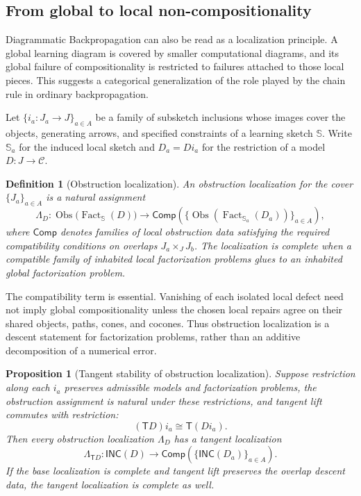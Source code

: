 \documentclass{article}
\newtheorem{definition}{Definition}
\newtheorem{proposition}{Proposition}
\newcommand{\C}{\mathcal{C}}
\newcommand{\T}{\mathsf{T}}
\newcommand{\INC}{\mathsf{INC}}
\newcommand{\Fact}{\operatorname{Fact}}
\newcommand{\Obs}{\operatorname{Obs}}
\begin{document}
\subsection{From global to local non-compositionality}

Diagrammatic Backpropagation can also be read as a localization principle.  A
global learning diagram is covered by smaller computational diagrams, and its
global failure of compositionality is restricted to failures attached to those
local pieces.  This suggests a categorical generalization of the role played
by the chain rule in ordinary backpropagation.

Let \(\{i_a:J_a\to J\}_{a\in A}\) be a family of subsketch inclusions whose
images cover the objects, generating arrows, and specified constraints of a
learning sketch \(\mathbb S\).  Write \(\mathbb S_a\) for the induced local
sketch and \(D_a=D i_a\) for the restriction of a model \(D:J\to\C\).

\begin{definition}[Obstruction localization]
An obstruction localization for the cover \(\{J_a\}_{a\in A}\) is a natural
assignment
\[
\Lambda_D:
\Obs\big(\Fact_{\mathbb S}(D)\big)
\longrightarrow
\mathsf{Comp}\!\left(
  \{\Obs(\Fact_{\mathbb S_a}(D_a))\}_{a\in A}
\right),
\]
where \(\mathsf{Comp}\) denotes families of local obstruction data satisfying
the required compatibility conditions on overlaps \(J_a\times_JJ_b\).  The
localization is \emph{complete} when a compatible family of inhabited local
factorization problems glues to an inhabited global factorization problem.
\end{definition}

The compatibility term is essential.  Vanishing of each isolated local defect
need not imply global compositionality unless the chosen local repairs agree on
their shared objects, paths, cones, and cocones.  Thus obstruction localization
is a descent statement for factorization problems, rather than an additive
decomposition of a numerical error.

\begin{proposition}[Tangent stability of obstruction localization]
Suppose restriction along each \(i_a\) preserves admissible models and
factorization problems, the obstruction assignment is natural under these
restrictions, and tangent lift commutes with restriction:
\[
(\T D)i_a\cong\T(Di_a).
\]
Then every obstruction localization \(\Lambda_D\) has a tangent localization
\[
\Lambda_{\T D}:
\INC(D)
\longrightarrow
\mathsf{Comp}\!\left(
  \{\INC(D_a)\}_{a\in A}
\right).
\]
If the base localization is complete and tangent lift preserves the overlap
descent data, the tangent localization is complete as well.
\end{proposition}
\end{document}
